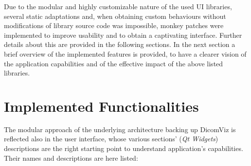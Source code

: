 \documentclass[conference]{IEEEtran}
\begin{document}
Due to the modular and highly customizable nature of the used UI libraries, several static adaptations and, when obtaining custom behaviours without modifications of library source code was impossible, monkey patches were implemented to improve usability and to obtain a captivating interface. Further details about this are provided in the following sections.
In the next section a brief overview of the implemented features is provided, to have a clearer vision of the application capabilities and of the effective impact of the above listed libraries.

\section{Implemented Functionalities}

The modular approach of the underlying architecture backing up DicomViz is reflected also in the user interface, whose various sections' (\textit{Qt Widgets}) descriptions are the right starting point to understand application's capabilities. Their names and descriptions are here listed:
\end{document}
